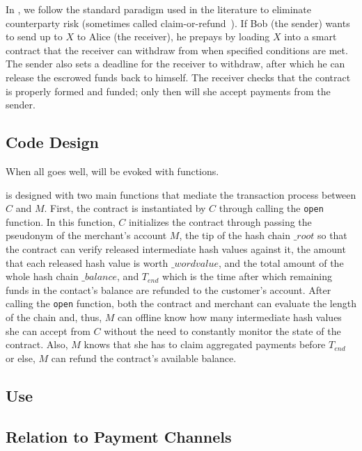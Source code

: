 In \ew, we follow the standard paradigm used in the literature to eliminate counterparty risk (sometimes called claim-or-refund~\cite{BK14}). If Bob (the sender) wants to send up to $X$ \eth to Alice (the receiver), he prepays by loading $X$ \eth into a smart contract that the receiver can withdraw from when specified conditions are met. The sender also sets a deadline for the receiver to withdraw, after which he can release the escrowed funds back to himself. The receiver checks that the contract is properly formed and funded; only then will she accept payments from the sender.

\subsection{Code Design}

When all goes well, \ew will be evoked with functions. 

 is designed with two main functions that mediate the transaction process between $C$ and $M$. First, the contract is instantiated by $C$ through calling the \texttt{open} function. In this function, $C$ initializes the contract through passing the pseudonym of the merchant's account $M$, the tip of the hash chain $\_root$ so that the contract can verify released intermediate hash values against it, the amount that each released hash value is worth $\_wordvalue$, and the total amount of the whole hash chain $\_balance$, and $T_{end}$ which is the time after which remaining funds in the contact's balance are refunded to the customer's account. After calling the \texttt{open} function, both the contract and merchant can evaluate the length of the chain and, thus, $M$ can offline know how many intermediate hash values she can accept from $C$ without the need to constantly monitor the state of the contract. Also, $M$ knows that she has to claim aggregated payments before $T_{end}$ or else, $M$ can refund the contract's available balance.

\subsection{Use}

\begin{compactlistn}
\item
\end{compactlistn}
\subsection{Relation to Payment Channels}
\label{sec:pcn}

